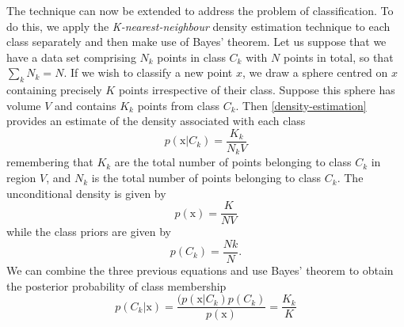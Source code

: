 The technique can now be extended to address the problem of classification. To do this, we
apply the \textit{K-nearest-neighbour} density estimation technique to each class separately
and then make use of Bayes’ theorem. Let us suppose that we have a data set comprising
$N_k$ points in class $C_k$ with $N$ points in total, so that $\sum_kN_k = N$. If we
wish to classify a new point $x$, we draw a sphere centred on $x$ containing precisely
$K$ points irrespective of their class. Suppose this sphere has volume $V$ and contains
$K_k$ points from class $C_k$. Then \ref{density-estimation} provides an estimate of the density associated with each class
$$
p(\mathrm{x}|C_k) = \frac{K_k}{N_kV}
$$
remembering that $K_k$ are the total number of points belonging to class $C_k$ in region $V$, and $N_k$ is the total number of points belonging to class $C_k$. The unconditional density is given by 
$$
p(\mathrm{x}) = \frac{K}{NV}
$$
while the class priors are given by
$$
p(C_k) = \frac{Nk}{N}.
$$
We can combine the three previous equations and use Bayes' theorem  to obtain the posterior probability of class membership
$$
p(C_k|\mathrm{x}) = \frac{(p(\mathrm{x}|C_k)p(C_k)}{p(\mathrm{x})}=\frac{K_k}{K}
$$
